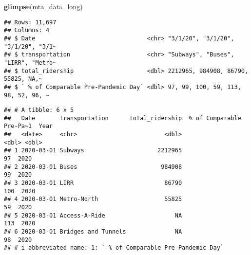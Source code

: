 \documentclass[
]{article}
\newenvironment{Shaded}{\begin{snugshade}}{\end{snugshade}}
\newcommand{\AttributeTok}[1]{\textcolor[rgb]{0.13,0.29,0.53}{#1}}
\newcommand{\CommentTok}[1]{\textcolor[rgb]{0.56,0.35,0.01}{\textit{#1}}}
\newcommand{\FunctionTok}[1]{\textcolor[rgb]{0.13,0.29,0.53}{\textbf{#1}}}
\newcommand{\NormalTok}[1]{#1}
\newcommand{\OtherTok}[1]{\textcolor[rgb]{0.56,0.35,0.01}{#1}}
\newcommand{\SpecialCharTok}[1]{\textcolor[rgb]{0.81,0.36,0.00}{\textbf{#1}}}
\newcommand{\StringTok}[1]{\textcolor[rgb]{0.31,0.60,0.02}{#1}}
\begin{document}
\begin{Shaded}
\begin{Highlighting}[]
\FunctionTok{glimpse}\NormalTok{(mta\_data\_long)}
\end{Highlighting}
\end{Shaded}

\begin{verbatim}
## Rows: 11,697
## Columns: 4
## $ Date                                <chr> "3/1/20", "3/1/20", "3/1/20", "3/1~
## $ transportation                      <chr> "Subways", "Buses", "LIRR", "Metro~
## $ total_ridership                     <dbl> 2212965, 984908, 86790, 55825, NA,~
## $ ` % of Comparable Pre-Pandemic Day` <dbl> 97, 99, 100, 59, 113, 98, 52, 96, ~
\end{verbatim}

\begin{Shaded}
\end{Shaded}

\begin{verbatim}
## # A tibble: 6 x 5
##   Date       transportation      total_ridership  % of Comparable Pre-Pa~1  Year
##   <date>     <chr>                         <dbl>                     <dbl> <dbl>
## 1 2020-03-01 Subways                     2212965                        97  2020
## 2 2020-03-01 Buses                        984908                        99  2020
## 3 2020-03-01 LIRR                          86790                       100  2020
## 4 2020-03-01 Metro-North                   55825                        59  2020
## 5 2020-03-01 Access-A-Ride                    NA                       113  2020
## 6 2020-03-01 Bridges and Tunnels              NA                        98  2020
## # i abbreviated name: 1: ` % of Comparable Pre-Pandemic Day`
\end{verbatim}
\end{document}
